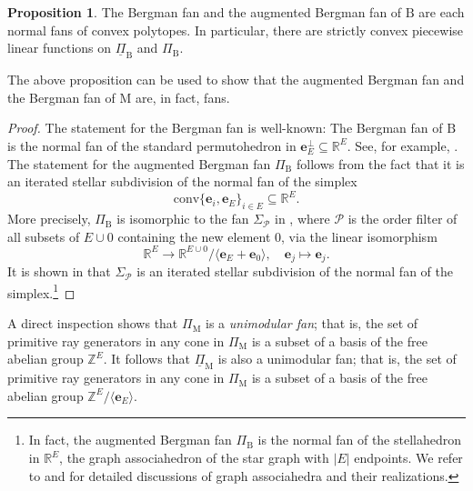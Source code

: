 \documentclass[11pt,reqno]{amsart}
\theoremstyle{definition}
\newtheorem{proposition}[theorem]{Proposition}
\theoremstyle{remark}
\newtheorem{remark}[theorem]{Remark}
\renewcommand{\(}{\left(}
\renewcommand{\)}{\right)}
\newcommand{\<}{\left<}
\renewcommand{\>}{\right>}
\begin{document}
\begin{proposition}\label{PropositionBoolean}
The Bergman fan and the augmented Bergman fan of $\mathrm{B}$ are each normal fans of convex polytopes.
In particular, there are strictly convex piecewise linear functions on $\underline{\Pi}_\mathrm{B}$ and $\Pi_\mathrm{B}$.
\end{proposition}

The above proposition can be used to show that the augmented Bergman fan  and the Bergman fan of $\mathrm{M}$ are, in fact, fans.

\begin{proof}
The statement for the Bergman fan is well-known: The Bergman fan of $\mathrm{B}$ is the normal fan of the standard permutohedron in 
$\mathbf{e}_E^\perp \subseteq \mathbb{R}^E$.
See, for example, \cite[Section 2]{AHK}. 
The statement for the augmented Bergman fan $\Pi_{\mathrm{B}}$ follows from the fact that it is an iterated stellar subdivision of the normal fan of the  simplex
\[
\text{conv}\{\mathbf{e}_i,\mathbf{e}_E\}_{i \in E} \subseteq \mathbb{R}^E.
\]
More precisely, $\Pi_\mathrm{B}$ is isomorphic to the fan $\Sigma_\mathscr{P}$ in \cite[Definition 2.3]{AHK},
where $\mathscr{P}$ is the order filter of all subsets of $E \cup 0$ containing the new element $0$, via the linear isomorphism
\[
\mathbb{R}^E \longrightarrow \mathbb{R}^{E \cup 0}/\langle \mathbf{e}_{E}+\mathbf{e}_0\rangle, \quad \mathbf{e}_j \longmapsto \mathbf{e}_j.
\]
It is shown in \cite[Proposition 2.4]{AHK} that $\Sigma_\mathscr{P}$ is an iterated stellar subdivision of the normal fan of the simplex.\footnote{In fact, the augmented Bergman fan $\Pi_\mathrm{B}$ is the normal fan of the stellahedron in $\mathbb{R}^E$, the graph associahedron of the star graph with $|E|$ endpoints.
We refer to \cite{CD} and \cite{Devadoss} for detailed discussions of graph associahedra and their realizations.}
\end{proof}

A direct inspection shows that $\Pi_\mathrm{M}$ is a \emph{unimodular fan}; that is, the set of primitive ray generators in any cone in $\Pi_\mathrm{M}$ is a subset of a basis of the free abelian group $\mathbb{Z}^E$.
It follows  that $\underline{\Pi}_\mathrm{M}$ is also a unimodular fan;
that is, the set of primitive ray generators in any cone in $\Pi_\mathrm{M}$ is a subset of a basis of  the free abelian group $\mathbb{Z}^E/ \langle \mathbf{e}_E \rangle$.
\end{document}
